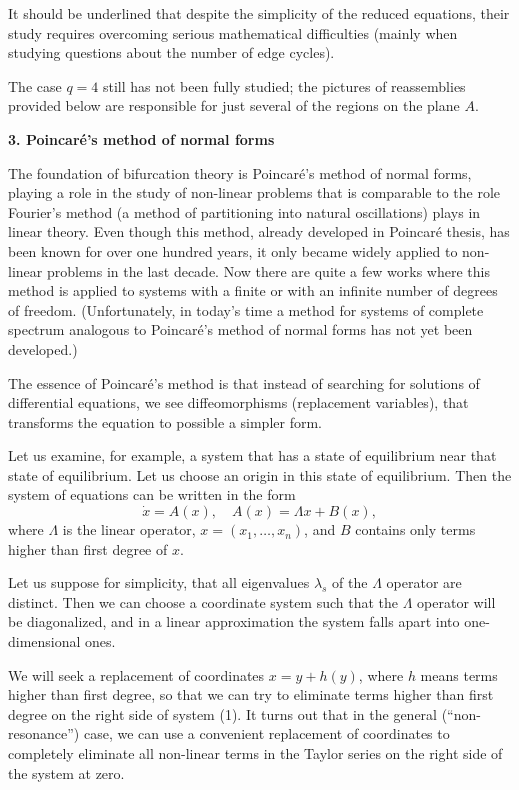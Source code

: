 \documentclass[12pt]{amsart}
\begin{document}
It should be underlined that despite the simplicity of the reduced equations,
their study requires overcoming serious mathematical difficulties (mainly when
studying questions about the number of edge cycles).

The case $q=4$ still has not been fully studied; the pictures of reassemblies
provided below are responsible for just several of the regions on the plane
$A$.\\

\centerline{\textbf{3. Poincar\'e's method of normal forms}}
\vspace{1em}
The foundation of bifurcation theory is Poincar\'e's method of normal forms,
playing a role in the study of non-linear problems that is comparable to the
role Fourier's method (a method of partitioning into natural oscillations) plays
in linear theory.
Even though this method, already developed in Poincar\'e thesis, has been known
for over one hundred years, it only became widely applied to non-linear problems
in the last decade.
Now there are quite a few works where this method is applied to systems with a
finite or with an infinite number of degrees of freedom.
(Unfortunately, in today's time a method for systems of complete spectrum
analogous to Poincar\'e's method of normal forms has not yet been developed.)

The essence of Poincar\'e's method is that instead of searching for solutions of
differential equations, we see diffeomorphisms (replacement variables), that
transforms the equation to possible a simpler form.

Let us examine, for example, a system that has a state of equilibrium near that
state of equilibrium.
Let us choose an origin in this state of equilibrium.
Then the system of equations can be written in the form
\begin{equation}
\dot x=A(x),\quad A(x)=\Lambda x+B(x),
\end{equation}
where $\Lambda$ is the linear operator, $x=(x_1,\dots,x_n)$, and $B$ contains
only terms higher than first degree of $x$.

Let us suppose for simplicity, that all eigenvalues $\lambda_s$ of the $\Lambda$
operator are distinct.
Then we can choose a coordinate system such that the $\Lambda$ operator will be
diagonalized, and in a linear approximation the system falls apart into
one-dimensional ones.

We will seek a replacement of coordinates $x=y+h(y)$, where $h$ means terms
higher than first degree, so that we can try to eliminate terms higher than
first degree on the right side of system (1).
It turns out that in the general (``non-resonance'') case, we can use a
convenient replacement of coordinates to completely eliminate all non-linear
terms in the Taylor series on the right side of the system at zero.
\end{document}
